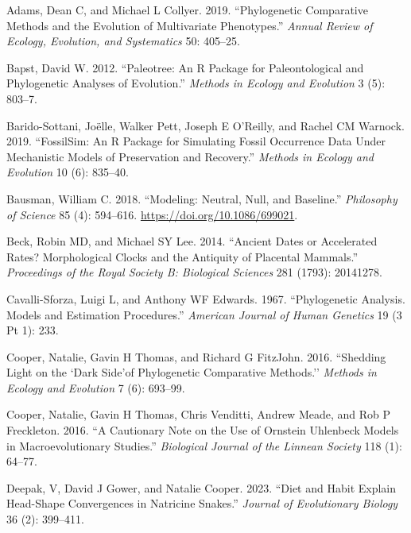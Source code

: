 \documentclass[
]{article}
\newlength{\cslhangindent}
\newenvironment{cslreferences}%
  {\setlength{\parindent}{0pt}%
  \everypar{\setlength{\hangindent}{\cslhangindent}}\ignorespaces}%
  {\par}
\begin{document}
\hypertarget{refs}{}
\begin{cslreferences}
\leavevmode\hypertarget{ref-adams2019multivarPCM}{}%
Adams, Dean C, and Michael L Collyer. 2019. ``Phylogenetic Comparative
Methods and the Evolution of Multivariate Phenotypes.'' \emph{Annual
Review of Ecology, Evolution, and Systematics} 50: 405--25.

\leavevmode\hypertarget{ref-paleotree}{}%
Bapst, David W. 2012. ``Paleotree: An R Package for Paleontological and
Phylogenetic Analyses of Evolution.'' \emph{Methods in Ecology and
Evolution} 3 (5): 803--7.

\leavevmode\hypertarget{ref-fossilsim}{}%
Barido-Sottani, Joëlle, Walker Pett, Joseph E O'Reilly, and Rachel CM
Warnock. 2019. ``FossilSim: An R Package for Simulating Fossil
Occurrence Data Under Mechanistic Models of Preservation and Recovery.''
\emph{Methods in Ecology and Evolution} 10 (6): 835--40.

\leavevmode\hypertarget{ref-bausman2018neutral}{}%
Bausman, William C. 2018. ``Modeling: Neutral, Null, and Baseline.''
\emph{Philosophy of Science} 85 (4): 594--616.
\url{https://doi.org/10.1086/699021}.

\leavevmode\hypertarget{ref-beck2014ancient}{}%
Beck, Robin MD, and Michael SY Lee. 2014. ``Ancient Dates or Accelerated
Rates? Morphological Clocks and the Antiquity of Placental Mammals.''
\emph{Proceedings of the Royal Society B: Biological Sciences} 281
(1793): 20141278.

\leavevmode\hypertarget{ref-cavalli1967BM}{}%
Cavalli-Sforza, Luigi L, and Anthony WF Edwards. 1967. ``Phylogenetic
Analysis. Models and Estimation Procedures.'' \emph{American Journal of
Human Genetics} 19 (3 Pt 1): 233.

\leavevmode\hypertarget{ref-cooper2016dark}{}%
Cooper, Natalie, Gavin H Thomas, and Richard G FitzJohn. 2016.
``Shedding Light on the `Dark Side'of Phylogenetic Comparative
Methods.'' \emph{Methods in Ecology and Evolution} 7 (6): 693--99.

\leavevmode\hypertarget{ref-cooper2016cautionary}{}%
Cooper, Natalie, Gavin H Thomas, Chris Venditti, Andrew Meade, and Rob P
Freckleton. 2016. ``A Cautionary Note on the Use of Ornstein Uhlenbeck
Models in Macroevolutionary Studies.'' \emph{Biological Journal of the
Linnean Society} 118 (1): 64--77.

\leavevmode\hypertarget{ref-deepak2023diet}{}%
Deepak, V, David J Gower, and Natalie Cooper. 2023. ``Diet and Habit
Explain Head-Shape Convergences in Natricine Snakes.'' \emph{Journal of
Evolutionary Biology} 36 (2): 399--411.


\end{cslreferences}
\end{document}
